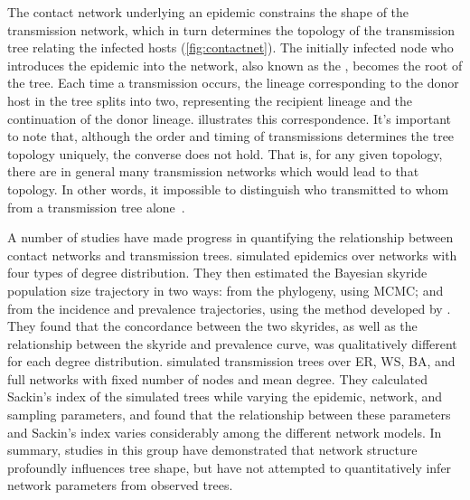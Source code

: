 The contact network underlying an epidemic constrains the shape of the
transmission network, which in turn determines the topology of the transmission
tree relating the infected hosts (\cref{fig:contactnet}). The initially
infected node who introduces the epidemic into the network, also known as the
, becomes the root of the tree. Each time a transmission
occurs, the lineage corresponding to the donor host in the tree splits into
two, representing the recipient lineage and the continuation of the donor
lineage.  illustrates this correspondence. It's important
to note that, although the order and timing of transmissions determines the
tree topology uniquely, the converse does not hold. That is, for any given
topology, there are in general many transmission networks which would lead to
that topology. In other words, it impossible to distinguish who transmitted to
whom from a transmission tree alone~\autocite{bernard2007hiv}.

A number of studies have made progress in quantifying the relationship between
contact networks and transmission trees. \textcite{o2010contact} simulated
epidemics over networks with four types of degree distribution. They then
estimated the Bayesian skyride~\autocite{minin2008smooth} population size
trajectory in two ways: from the phylogeny, using \gls{MCMC}; and from the
incidence and prevalence trajectories, using the method developed by 
\textcite{volz2009phylodynamics}. They found that the concordance between
the two skyrides, as well as the relationship between the skyride and
prevalence curve, was qualitatively different for each degree distribution.
\citeauthor{leventhal2012inferring} simulated transmission trees over \gls{ER},
\gls{WS}, \gls{BA}, and full networks with fixed number of nodes and mean
degree. They calculated Sackin's index of the simulated trees while varying the
epidemic, network, and sampling parameters, and found that the relationship
between these parameters and Sackin's index varies considerably among the
different network models. In summary, studies in this group have demonstrated
that network structure profoundly influences tree shape, but have not attempted
to quantitatively infer network parameters from observed trees.


